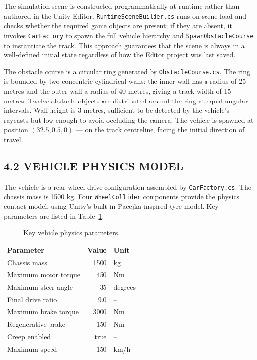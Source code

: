 \documentclass[12pt,a4paper]{article}
\begin{document}
\indent The simulation scene is constructed programmatically at runtime rather than
authored in the Unity Editor. \texttt{RuntimeSceneBuilder.cs} runs on scene
load and checks whether the required game objects are present; if they are
absent, it invokes \texttt{CarFactory} to spawn the full vehicle hierarchy and
\texttt{SpawnObstacleCourse} to instantiate the track. This approach guarantees
that the scene is always in a well-defined initial state regardless of how the
Editor project was last saved.

The obstacle course is a circular ring generated by \texttt{ObstacleCourse.cs}.
The ring is bounded by two concentric cylindrical walls: the inner wall has a
radius of 25 metres and the outer wall a radius of 40 metres, giving a track
width of 15 metres. Twelve obstacle objects are distributed around the ring at
equal angular intervals. Wall height is 3 metres, sufficient to be detected by
the vehicle's raycasts but low enough to avoid occluding the camera. The vehicle
is spawned at position $(32.5, 0.5, 0)$ --- on the track centreline, facing the
initial direction of travel.

\subsection*{4.2 \quad VEHICLE PHYSICS MODEL}

\indent The vehicle is a rear-wheel-drive configuration assembled by
\texttt{CarFactory.cs}. The chassis mass is 1500 kg. Four \texttt{WheelCollider}
components provide the physics contact model, using Unity's built-in
Pacejka-inspired tyre model. Key parameters are listed in
Table~\ref{tab:vehicle-params}.

\begin{table}[H]
  \centering
  \caption{Key vehicle physics parameters.}
  \label{tab:vehicle-params}
  \vspace{0.5\baselineskip}
  \begin{tabular}{lrl}
    \toprule
    \textbf{Parameter} & \textbf{Value} & \textbf{Unit} \\
    \midrule
    Chassis mass           & 1500   & kg \\
    Maximum motor torque   & 450    & Nm \\
    Maximum steer angle    & 35     & degrees \\
    Final drive ratio      & 9.0    & -- \\
    Maximum brake torque   & 3000   & Nm \\
    Regenerative brake     & 150    & Nm \\
    Creep enabled          & true   & -- \\
    Maximum speed          & 150    & km/h \\
    \bottomrule
  \end{tabular}
\end{table}
\end{document}

